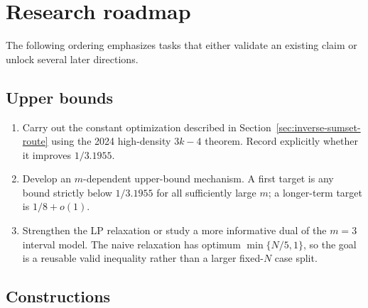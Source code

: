 \section{Research roadmap}
\label{sec:research-roadmap}

The following ordering emphasizes tasks that either validate an existing
claim or unlock several later directions.

\subsection{Upper bounds}

\begin{enumerate}
    \item Carry out the constant optimization described in
    Section~\ref{sec:inverse-sumset-route} using the 2024 high-density
    \(3k-4\) theorem.  Record explicitly whether it improves \(1/3.1955\).
    \item Develop an \(m\)-dependent upper-bound mechanism.  A first target is
    any bound strictly below \(1/3.1955\) for all sufficiently large \(m\); a
    longer-term target is \(1/8+o(1)\).
    \item Strengthen the LP relaxation or study a more informative dual of the
    \(m=3\) interval model.  The naive relaxation has optimum
    \(\min\{N/5,1\}\), so the goal is a reusable valid inequality rather than
    a larger fixed-\(N\) case split.
\end{enumerate}

\subsection{Constructions}

